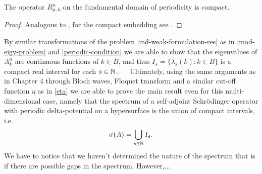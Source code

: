 \begin{theorem}
	The operator $R_{\mu, k}^{n}$ on the fundamental domain of periodicity is compact.	

	\begin{proof}
		Analogous to , for the compact embedding see \cite[Chap. 4]{Adams}.	
	\end{proof}
\end{theorem}

By similar transformations of the problem \eqref{md-weak-formulation-res} as in \eqref{mod-eigv-problem} and \eqref{periodic-condition} we are able to show that the eigenvalues of $A^{n}_{k}$ are continuous functions of $k \in \overline{B}$, and thus $I_{s} = \{ \lambda_{s}(k) : k \in \overline{B} \}$ is a compact real interval for each $s \in \mathbb{N}$.
~\newline ~\newline
Ultimately, using the same arguments as in Chapter 4 through Bloch waves, Floquet transform and a similar cut-off function $\eta$ as in \eqref{eta} we are able to prove the main result even for this multi-dimensional case, namely that the spectrum of a self-adjoint Schrödinger operator with periodic delta-potential on a hypersurface is the union of compact intervals, i.e.
	\[ \sigma(A) = \bigcup_{s \in \mathbb{N}} I_{s}. \]
We have to notice that we haven't determined the nature of the spectrum that is if there are possible gaps in the spectrum. However,... %